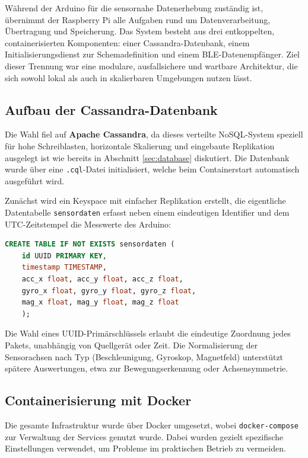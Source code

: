 Während der Arduino für die sensornahe Datenerhebung zuständig ist, übernimmt der Raspberry Pi alle Aufgaben rund um Datenverarbeitung, Übertragung und Speicherung. Das System besteht aus drei entkoppelten, containerisierten Komponenten: einer Cassandra-Datenbank, einem Initialisierungsdienst zur Schemadefinition und einem BLE-Datenempfänger. Ziel dieser Trennung war eine modulare, ausfallsichere und wartbare Architektur, die sich sowohl lokal als auch in skalierbaren Umgebungen nutzen lässt.

\subsection{Aufbau der Cassandra-Datenbank}

Die Wahl fiel auf \textbf{Apache Cassandra}, da dieses verteilte NoSQL-System speziell für hohe Schreiblasten, horizontale Skalierung und eingebaute Replikation ausgelegt ist wie bereits in Abschnitt \ref{sec:database} diskutiert. Die Datenbank wurde über eine \texttt{.cql}-Datei initialisiert, welche beim Containerstart automatisch ausgeführt wird.

Zunächst wird ein Keyspace mit einfacher Replikation erstellt, die eigentliche Datentabelle \texttt{sensordaten} erfasst neben einem eindeutigen Identifier und dem UTC-Zeitstempel die Messwerte des Arduino:

\begin{lstlisting}[language=SQL, caption={Sensordaten Tabelle}, label=fig:sensordataTable]
	CREATE TABLE IF NOT EXISTS sensordaten (
	id UUID PRIMARY KEY,
	timestamp TIMESTAMP,
	acc_x float, acc_y float, acc_z float,
	gyro_x float, gyro_y float, gyro_z float,
	mag_x float, mag_y float, mag_z float
	);
\end{lstlisting}

Die Wahl eines \ac{UUID}-Primärschlüssels erlaubt die eindeutige Zuordnung jedes Pakets, unabhängig von Quellgerät oder Zeit. Die Normalisierung der Sensorachsen nach Typ (Beschleunigung, Gyroskop, Magnetfeld) unterstützt spätere Auswertungen, etwa zur Bewegungserkennung oder Achsensymmetrie.

\subsection{Containerisierung mit Docker}

Die gesamte Infrastruktur wurde über Docker umgesetzt, wobei \texttt{docker-compose} zur Verwaltung der Services genutzt wurde. Dabei wurden gezielt spezifische Einstellungen verwendet, um Probleme im praktischen Betrieb zu vermeiden.

